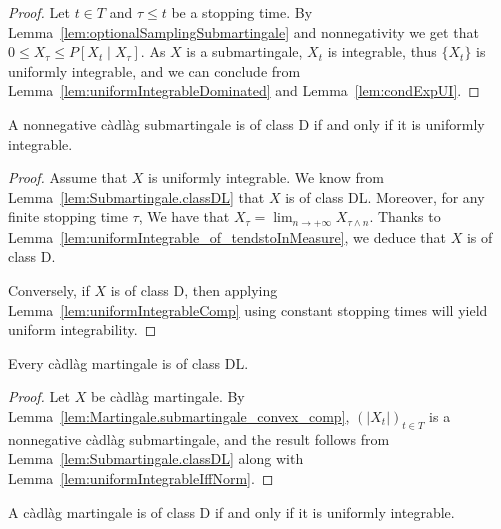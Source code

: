 \begin{proof}
Let $t \in T$ and $\tau \le t$ be a stopping time. By Lemma~\ref{lem:optionalSamplingSubmartingale} and nonnegativity we get that $0 \le X_\tau \le P[X_t \mid X_\tau]$. As $X$ is a submartingale, $X_t$ is integrable, thus $\{X_t\}$ is uniformly integrable, and we can conclude from Lemma~\ref{lem:uniformIntegrableDominated} and Lemma~\ref{lem:condExpUI}.
\end{proof}


\begin{lemma}\label{lem:Submartingale.classD_iff_uniformIntegrable}
  \leanok
A nonnegative càdlàg submartingale is of class D if and only if it is uniformly integrable.
\end{lemma}

\begin{proof}
Assume that $X$ is uniformly integrable. We know from Lemma~\ref{lem:Submartingale.classDL} that $X$ is of class DL. Moreover, for any finite stopping time $\tau$, We have that $X_\tau = \lim_{n \to +\infty} X_{\tau \land n}$. Thanks to Lemma~\ref{lem:uniformIntegrable_of_tendstoInMeasure}, we deduce that $X$ is of class D.

Conversely, if $X$ is of class D, then applying Lemma~\ref{lem:uniformIntegrableComp} using constant stopping times will yield uniform integrability.
\end{proof}


\begin{lemma}\label{lem:Martingale.classDL}
  \leanok
Every càdlàg martingale is of class DL.
\end{lemma}

\begin{proof}
Let $X$ be càdlàg martingale. By Lemma~\ref{lem:Martingale.submartingale_convex_comp}, $(|X_t|)_{t \in T}$ is a nonnegative càdlàg submartingale, and the result follows from Lemma~\ref{lem:Submartingale.classDL} along with Lemma~\ref{lem:uniformIntegrableIffNorm}.
\end{proof}

\begin{lemma}\label{lem:Martingale.classD_iff_uniformIntegrable}
  \leanok
A càdlàg martingale is of class D if and only if it is uniformly integrable.
\end{lemma}

